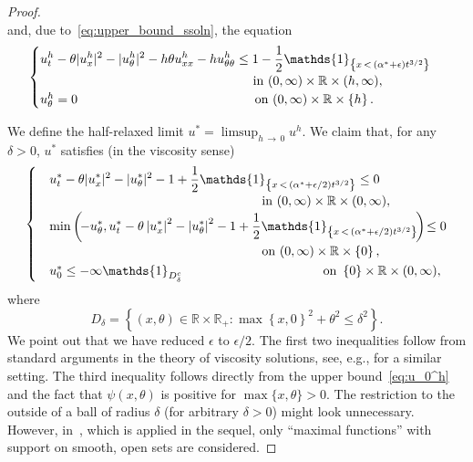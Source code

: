 \documentclass[AHL,Unicode,longabstracts]{cedram}
\newcommand{\R}{\mathbb{R}}
\newcommand{\1}{\mathds{1}}
\newcommand{\e}{\epsilon}
\begin{document}
\begin{proof}
\begin{equation}
\end{equation}
and, due to~\eqref{eq:upper_bound_ssoln}, the equation
\begin{equation*}
\begin{cases}
\displaystyle u^h_t - \theta |u^h_x|^2 - |u^h_\theta|^2 - h \theta u^h_{xx} - h u^h_{\theta\theta} \leq 1 - \frac{1}{2}\1_{\left\{x\,<\,\left(\alpha^*+\e\right)t^{3/2}\right\}} \\
\mkern300mu \text{in } (0,\infty)\times \R \times (h,\infty),
\\
u^h_\theta = 0 \mkern250mu \text{on } (0,\infty)\times\R\times\left\{h\right\}.
\end{cases}
\end{equation*}

We define the half-relaxed limit $u^* = \limsup_{h\,\rightarrow\,0} u^h$. We claim that, for any $\delta>0$, $u^*$ satisfies (in the viscosity sense)
\begin{equation}\label{eq:half_relaxed}
\begin{cases}
&\displaystyle u^*_t - \theta |u^*_x|^2 - |u^*_\theta|^2 - 1 + \frac{1}{2}\1_{\left\{x\,<\,\left(\alpha^*+\e/2\right)t^{3/2}\right\}} \leq 0\\[0.10em]
&\mkern300mu \text{in } (0,\infty)\times\R\times(0,\infty),
\\[0.10em]
&\displaystyle\min\left(\!-u^*_\theta, u^*_t - \theta \left|u^*_x\right|^2 - \left|u^*_\theta\right|^2 - 1 + \frac{1}{2}\1_{\left\{x\,<\,\left(\alpha^*+\e/2\right)t^{3/2}\right\}}\!\right)\!\leq 0\\[0.10em]
& \mkern300mu\text{on } (0,\infty)\times\R\times\left\{0\right\},
\\[0.10em]
&u^*_0 \leq -\infty\1_{D_\delta^c} \mkern199mu\text{on } \left\{0\right\}\times \R\times(0,\infty),
\end{cases}
\end{equation}
where 
\[
D_\delta = \left\{(x,\theta) \in \R\times \R_+ : \max\left\{x,0\right\}^2 + \theta^2 \leq \delta^2\right\}.
\]
We point out that we have reduced $\e$ to $\e/2$. The first two inequalities follow from standard arguments in the theory of viscosity solutions, see, e.g., \cite[Section~3.2]{HendersonPerthameSouganidis} for a similar setting. The third inequality follows directly from the upper bound~\eqref{eq:u_0^h} and the fact that $\psi(x,\theta)$ is positive for $\max\{x,\theta\}>0$. The restriction to the outside of a ball of radius $\delta$ (for arbitrary $\delta>0$) might look unnecessary. However, in~\cite{CrandallLionsSouganidis}, which is applied in the sequel, only ``maximal functions'' with support on smooth, open sets are considered.


\end{proof}
\end{document}
